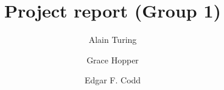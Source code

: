 \title{Project report (Group 1)} %
\author{Alain Turing \and Grace Hopper \and Edgar F. Codd} %

\institute{\lectureInstitute} %
\begin{report}











\end{report}

